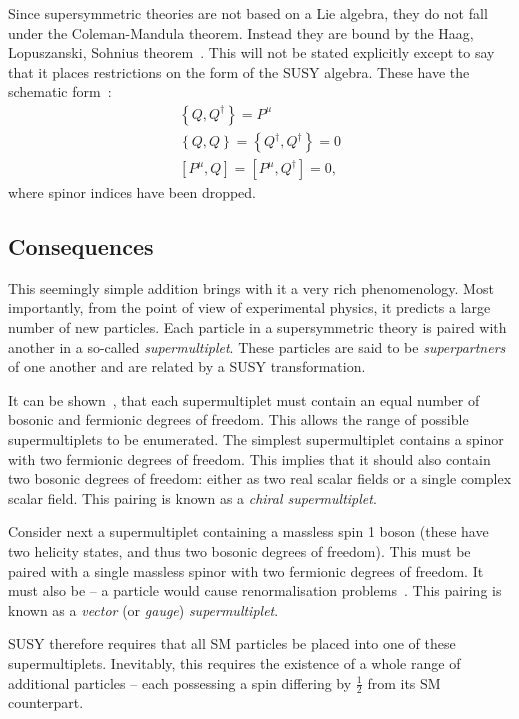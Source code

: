 Since supersymmetric theories are not based on a Lie algebra, they do not fall
under the Coleman-Mandula theorem. Instead they are bound by the Haag,
Lopuszanski, Sohnius theorem~\cite{hls_theorem}. This will not be stated explicitly except to say
that it places restrictions on the form of the \ac{SUSY} algebra. These have the
schematic form~\cite{susy_primer}:
\begin{eqnarray}
\label{eqn:susy_commutator}
\left\{Q,Q^{\dagger}\right\} = P^{\mu}\\
\left\{Q,Q\right\} = \left\{Q^{\dagger}, Q^{\dagger}\right\} = 0\\
\left[P^{\mu}, Q\right] = \left[P^{\mu}, Q^{\dagger}\right] = 0,
\end{eqnarray}
where spinor indices have been dropped.

\subsection{Consequences}
\label{sec:consequences}
This seemingly simple addition brings with it a very rich phenomenology. Most
importantly, from the point of view of experimental physics, it predicts a large
number of new particles. Each particle in a supersymmetric theory is paired with
another in a so-called \emph{supermultiplet}. These particles are said to be
\emph{superpartners} of one another and are related by a \ac{SUSY}
transformation.

It can be shown~\cite{susy_primer}, that each supermultiplet must contain an
equal number of bosonic and fermionic degrees of freedom. This allows the range
of possible supermultiplets to be enumerated. The simplest supermultiplet
contains a spinor with two fermionic degrees of freedom. This implies that it
should also contain two bosonic degrees of freedom: either as two real scalar
fields or a single complex scalar field. This pairing is known as a \emph{chiral
  supermultiplet}.

Consider next a supermultiplet containing a massless spin 1 boson
(these have two helicity states, and thus two bosonic degrees of
freedom). This must be paired with a single massless spinor with two
fermionic degrees of freedom. It must also be \spinhalf -- a
\spinthreetwo particle would cause renormalisation problems~\cite{susy_primer}. This
pairing is known as a \emph{vector} (or \emph{gauge})
\emph{supermultiplet}.

\ac{SUSY} therefore requires that all \ac{SM} particles be placed into one
of these supermultiplets. Inevitably, this requires the existence of a whole
range of additional particles -- each possessing a spin differing by
$\frac{1}{2}$ from its \ac{SM} counterpart.


